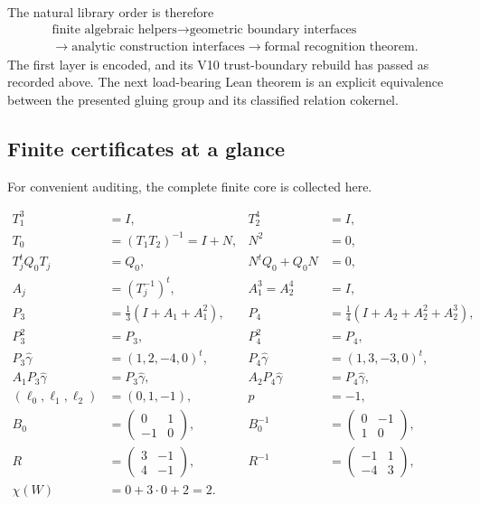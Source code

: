 \documentclass[11pt,reqno]{amsart}
\numberwithin{equation}{section}
\newcommand{\wideg}{\widehat\gamma}
\theoremstyle{definition}
\begin{document}
The natural library order is therefore
\[
\begin{gathered}
\text{finite algebraic helpers}
\longrightarrow
\text{geometric boundary interfaces}
\\[-1pt]
\longrightarrow
\text{analytic construction interfaces}
\longrightarrow
\text{formal recognition theorem}.
\end{gathered}
\]
The first layer is encoded, and its V10 trust-boundary rebuild has passed as recorded above. The next load-bearing Lean theorem is an explicit equivalence between the presented gluing group and its classified relation cokernel.

\subsection{Finite certificates at a glance}\label{sec:certificates}


For convenient auditing, the complete finite core is collected here.

\begin{align*}
T_1^3&=I,&T_2^4&=I,\\
T_0&=(T_1T_2)^{-1}=I+N,&N^2&=0,\\
T_j^tQ_0T_j&=Q_0,&N^tQ_0+Q_0N&=0,\\
A_j&=(T_j^{-1})^t,&A_1^3=A_2^4&=I,\\
P_3&=\tfrac13(I+A_1+A_1^2),&P_4&=\tfrac14(I+A_2+A_2^2+A_2^3),\\
P_3^2&=P_3,&P_4^2&=P_4,\\
P_3\wideg&=(1,2,-4,0)^t,&P_4\wideg&=(1,3,-3,0)^t,\\
A_1P_3\wideg&=P_3\wideg,&A_2P_4\wideg&=P_4\wideg,\\
(\ell_0,\ell_1,\ell_2)&=(0,1,-1),&p&=-1,\\
B_0&=\begin{pmatrix}0&1\\-1&0\end{pmatrix},&B_0^{-1}&=\begin{pmatrix}0&-1\\1&0\end{pmatrix},\\
R&=\begin{pmatrix}3&-1\\4&-1\end{pmatrix},&R^{-1}&=\begin{pmatrix}-1&1\\-4&3\end{pmatrix},\\
\chi(W)&=0+3\cdot0+2=2.&&
\end{align*}
\end{document}
